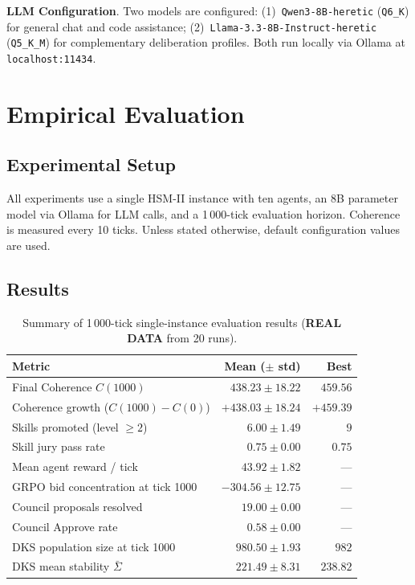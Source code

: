 \documentclass[11pt]{article}
\begin{document}
\textbf{LLM Configuration}. Two models are configured: (1)~\texttt{Qwen3-8B-heretic}
(\texttt{Q6\_K}) for general chat and code assistance; (2)~\texttt{Llama-3.3-8B-Instruct-heretic}
(\texttt{Q5\_K\_M}) for complementary deliberation profiles. Both run locally via
Ollama at \texttt{localhost:11434}.

\section{Empirical Evaluation}
\nopagebreak[4]
\label{sec:eval}

\subsection{Experimental Setup}

All experiments use a single HSM-II instance with ten agents, an
8B parameter model via Ollama for LLM calls, and a 1\,000-tick
evaluation horizon. Coherence is measured every 10 ticks. Unless stated
otherwise, default configuration values are used.

\subsection{Results}

\begin{table}[H]
\centering
\caption{Summary of 1\,000-tick single-instance evaluation results (\textbf{REAL DATA} from 20 runs).}
\label{tab:results}
\small
{}
\begin{tabular}{lrr}
\toprule
\textbf{Metric} & \textbf{Mean ($\pm$ std)} & \textbf{Best} \\
\midrule
Final Coherence $C(1000)$        & $438.23 \pm 18.22$ & $459.56$ \\
Coherence growth ($C(1000)-C(0)$)& $+438.03 \pm 18.24$ & $+459.39$ \\
Skills promoted (level $\geq 2$) & $6.00 \pm 1.49$ & $9$ \\
Skill jury pass rate             & $0.75 \pm 0.00$ & $0.75$ \\
Mean agent reward / tick         & $43.92 \pm 1.82$ & --- \\
GRPO bid concentration at tick 1000 & $-304.56 \pm 12.75$ & --- \\
Council proposals resolved       & $19.00 \pm 0.00$ & --- \\
Council Approve rate             & $0.58 \pm 0.00$ & --- \\
DKS population size at tick 1000 & $980.50 \pm 1.93$ & $982$ \\
DKS mean stability $\bar{\Sigma}$ & $221.49 \pm 8.31$ & $238.82$ \\
\bottomrule
\end{tabular}
\end{table}
\end{document}
